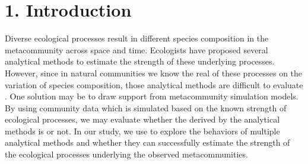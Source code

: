 
\chapter*{1. Introduction}
\setcounter{chapter}{1}
\noindent
Diverse ecological processes result in different species composition in the metacommunity across space and time. Ecologists have proposed several analytical methods to estimate the strength of these underlying processes\DIFdelbegin {}\DIFdelend . However, since in \DIFdelbegin {}\DIFdelend natural communities we \DIFdelbegin {}\DIFdelend \DIFaddbegin {}\DIFaddend know the real \DIFdelbegin {}\DIFdelend \DIFaddbegin {}\DIFaddend of these processes on the variation of species composition, those analytical methods are difficult to evaluate \DIFaddbegin {}\DIFaddend . One solution may be to draw support from \DIFdelbegin {}\DIFdelend metacommunity simulation models. By using \DIFdelbegin {}\DIFdelend community data which is simulated based on the known strength of ecological processes, we may evaluate whether the \DIFdelbegin {}\DIFdelend \DIFaddbegin {}\DIFaddend derived by the analytical methods is \DIFdelbegin {}\DIFdelend \DIFaddbegin {}\DIFaddend or not. In our study, we use \DIFdelbegin {}\DIFdelend \DIFaddbegin {}\DIFaddend to explore the behaviors of multiple analytical methods and \DIFdelbegin {}\DIFdelend \DIFaddbegin {}\DIFaddend whether they can successfully estimate the strength of the ecological processes underlying the observed metacommunities.

